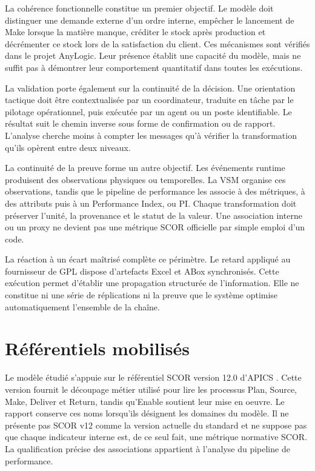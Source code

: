La cohérence fonctionnelle constitue un premier objectif. Le modèle doit distinguer une demande externe d'un ordre interne, empêcher le lancement de Make lorsque la matière manque, créditer le stock après production et décrémenter ce stock lors de la satisfaction du client. Ces mécanismes sont vérifiés dans le projet AnyLogic. Leur présence établit une capacité du modèle, mais ne suffit pas à démontrer leur comportement quantitatif dans toutes les exécutions.

La validation porte également sur la continuité de la décision. Une orientation tactique doit être contextualisée par un coordinateur, traduite en tâche par le pilotage opérationnel, puis exécutée par un agent ou un poste identifiable. Le résultat suit le chemin inverse sous forme de confirmation ou de rapport. L'analyse cherche moins à compter les messages qu'à vérifier la transformation qu'ils opèrent entre deux niveaux.

La continuité de la preuve forme un autre objectif. Les événements runtime produisent des observations physiques ou temporelles. La VSM organise ces observations, tandis que le pipeline de performance les associe à des métriques, à des attributs puis à un Performance Index, ou PI. Chaque transformation doit préserver l'unité, la provenance et le statut de la valeur. Une association interne ou un proxy ne devient pas une métrique SCOR officielle par simple emploi d'un code.

La réaction à un écart maîtrisé complète ce périmètre. Le retard appliqué au fournisseur de GPL dispose d'artefacts Excel et ABox synchronisés. Cette exécution permet d'établir une propagation structurée de l'information. Elle ne constitue ni une série de réplications ni la preuve que le système optimise automatiquement l'ensemble de la chaîne.

\section{Référentiels mobilisés}

Le modèle étudié s'appuie sur le référentiel SCOR version 12.0 d'APICS \cite{apics2017}. Cette version fournit le découpage métier utilisé pour lire les processus Plan, Source, Make, Deliver et Return, tandis qu'Enable soutient leur mise en oeuvre. Le rapport conserve ces noms lorsqu'ils désignent les domaines du modèle. Il ne présente pas SCOR v12 comme la version actuelle du standard et ne suppose pas que chaque indicateur interne est, de ce seul fait, une métrique normative SCOR. La qualification précise des associations appartient à l'analyse du pipeline de performance.

